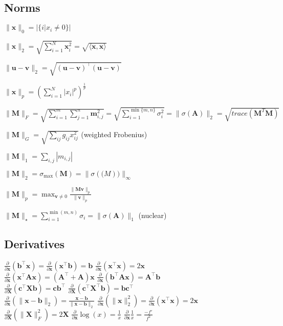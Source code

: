 \subsection*{Norms}
\begin{inparaitem}
	\item $\|\mathbf{x}\|_0 = |\{i | x_i \neq 0\}|$ 
	\item $\|\mathbf{x}\|_2 = \sqrt{\sum_{i=1}^{N} \mathbf{x}_i^2} = \sqrt{\langle \mathbf{x}, \mathbf{x} \rangle}$ 
	\item $\|\mathbf{u}-\mathbf{v}\|_2 = \sqrt{(\mathbf{u}-\mathbf{v})^\top(\mathbf{u}-\mathbf{v})}$ 
	\item $\|\mathbf{x}\|_p = \left( \sum_{i=1}^{N} |x_i|^p \right)^{\frac{1}{p}}$ 
	\item
	$\|\mathbf{M}\|_F =\allowbreak \sqrt{\sum_{i=1}^{m} \sum_{j=1}^{n}\mathbf{m}_{i,j}^2} = \sqrt{\sum_{i=1}^{\min\{m, n\}} \sigma_i^2} \allowbreak = \|\sigma(\mathbf{A})\|_2  = \sqrt{trace(\mathbf{M}^T\mathbf{M})} $
	\item $\|\mathbf{M}\|_G=\sqrt{\sum_{ij}{g_{ij}x^2_{ij}}}$ (weighted Frobenius) 
	\item
	$\|\mathbf{M}\|_1 = \sum_{i,j} | m_{i,j}|$ 
	\item $\|\mathbf{M}\|_2 = \sigma_{\text{max}}(\mathbf{M}) = \|\sigma(\mathbf(M))\|_\infty$
	\item $\|\mathbf{M}\|_p = \max_{\mathbf{v} \neq 0} \frac{\|\mathbf{M}\mathbf{v}\|_p}{\|\mathbf{v}\|_p}$ 
	\item $\|\mathbf{M}\|_\star = \sum_{i=1}^{\min(m, n)} \sigma_i = \|\sigma(\mathbf{A})\|_1$ (nuclear)
\end{inparaitem}

\subsection*{Derivatives}
$\frac{\partial}{\partial \mathbf{x}}(\mathbf{b}^\top \mathbf{x}) = \frac{\partial}{\partial \mathbf{x}}(\mathbf{x}^\top \mathbf{b}) = \mathbf{b}$ \quad
$\frac{\partial}{\partial \mathbf{x}}(\mathbf{x}^\top \mathbf{x}) = 2\mathbf{x}$\\
$\frac{\partial}{\partial \mathbf{x}}(\mathbf{x}^\top \mathbf{A}\mathbf{x}) = (\mathbf{A}^\top + \mathbf{A})\mathbf{x}$ \quad
$\frac{\partial}{\partial \mathbf{x}}(\mathbf{b}^\top \mathbf{A}\mathbf{x}) = \mathbf{A}^\top \mathbf{b}$\\
$\frac{\partial}{\partial \mathbf{X}}(\mathbf{c}^\top \mathbf{X} \mathbf{b}) = \mathbf{c}\mathbf{b}^\top$ \quad
$\frac{\partial}{\partial \mathbf{X}}(\mathbf{c}^\top \mathbf{X}^\top \mathbf{b}) = \mathbf{b}\mathbf{c}^\top$\\
$\frac{\partial}{\partial \mathbf{x}}(\| \mathbf{x}-\mathbf{b} \|_2) = \frac{\mathbf{x}-\mathbf{b}}{\|\mathbf{x}-\mathbf{b}\|_2}$ \quad
$\frac{\partial}{\partial \mathbf{x}}(\|\mathbf{x}\|^2_2) = \frac{\partial}{\partial \mathbf{x}} (\mathbf{x}^\top \mathbf{x}) = 2\mathbf{x}$\\
$\frac{\partial}{\partial \mathbf{X}}(\|\mathbf{X}\|_F^2) = 2\mathbf{X}$ \quad
$\frac{\partial}{\partial \mathbf{x}}\log(x) = \frac{1}{x}$ \quad
$\frac{\partial}{\partial \mathbf{x}}\frac{1}{x} = \frac{-f'}{f^2}$


